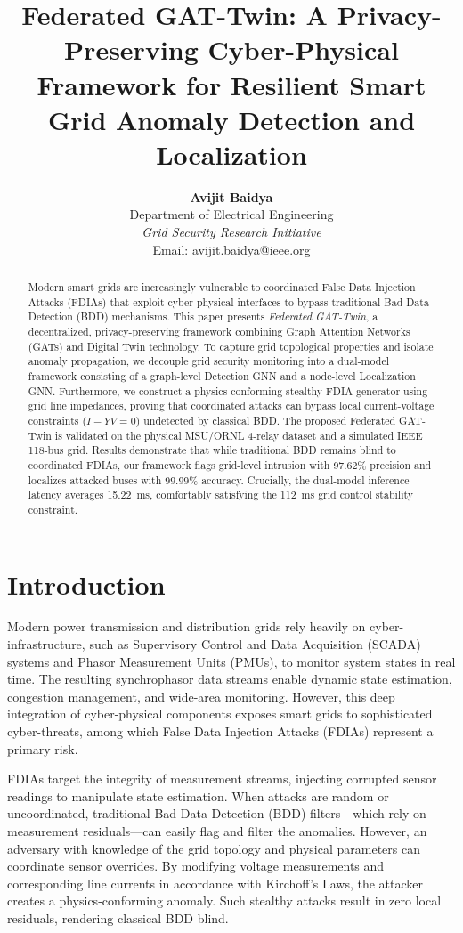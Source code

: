\documentclass[10pt, a4paper, twocolumn]{article}
\title{\textbf{\Large Federated GAT-Twin: A Privacy-Preserving Cyber-Physical Framework for Resilient Smart Grid Anomaly Detection and Localization}}
\author{
    \textbf{Avijit Baidya} \\
    \small Department of Electrical Engineering \\
    \small \textit{Grid Security Research Initiative} \\
    \small Email: avijit.baidya@ieee.org
}
\date{}
\begin{document}
\maketitle

\begin{abstract}
Modern smart grids are increasingly vulnerable to coordinated False Data Injection Attacks (FDIAs) that exploit cyber-physical interfaces to bypass traditional Bad Data Detection (BDD) mechanisms. This paper presents \textit{Federated GAT-Twin}, a decentralized, privacy-preserving framework combining Graph Attention Networks (GATs) and Digital Twin technology. To capture grid topological properties and isolate anomaly propagation, we decouple grid security monitoring into a dual-model framework consisting of a graph-level Detection GNN and a node-level Localization GNN. Furthermore, we construct a physics-conforming stealthy FDIA generator using grid line impedances, proving that coordinated attacks can bypass local current-voltage constraints ($I - YV = 0$) undetected by classical BDD. The proposed Federated GAT-Twin is validated on the physical MSU/ORNL 4-relay dataset and a simulated IEEE 118-bus grid. Results demonstrate that while traditional BDD remains blind to coordinated FDIAs, our framework flags grid-level intrusion with 97.62\% precision and localizes attacked buses with 99.99\% accuracy. Crucially, the dual-model inference latency averages 15.22~ms, comfortably satisfying the 112~ms grid control stability constraint.
\end{abstract}


\section{Introduction}
Modern power transmission and distribution grids rely heavily on cyber-infrastructure, such as Supervisory Control and Data Acquisition (SCADA) systems and Phasor Measurement Units (PMUs), to monitor system states in real time. The resulting synchrophasor data streams enable dynamic state estimation, congestion management, and wide-area monitoring. However, this deep integration of cyber-physical components exposes smart grids to sophisticated cyber-threats, among which False Data Injection Attacks (FDIAs) represent a primary risk.

FDIAs target the integrity of measurement streams, injecting corrupted sensor readings to manipulate state estimation. When attacks are random or uncoordinated, traditional Bad Data Detection (BDD) filters—which rely on measurement residuals—can easily flag and filter the anomalies. However, an adversary with knowledge of the grid topology and physical parameters can coordinate sensor overrides. By modifying voltage measurements and corresponding line currents in accordance with Kirchoff's Laws, the attacker creates a physics-conforming anomaly. Such stealthy attacks result in zero local residuals, rendering classical BDD blind.
\end{document}
